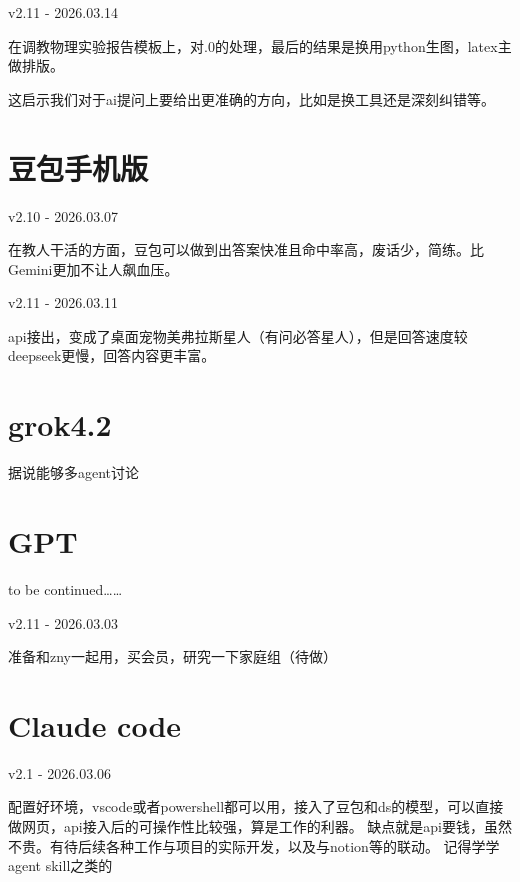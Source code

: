 \documentclass[11pt, a4paper, oneside]{book}
\begin{document}
\begin{updatelog}{v2.11 - 2026.03.14}
     
   在调教物理实验报告模板上，对.0的处理，最后的结果是换用python生图，latex主做排版。

   这启示我们对于ai提问上要给出更准确的方向，比如是换工具还是深刻纠错等。

\end{updatelog}

\section{豆包手机版}
\begin{inspiration}{v2.10 - 2026.03.07}
     
  在教人干活的方面，豆包可以做到出答案快准且命中率高，废话少，简练。比Gemini更加不让人飙血压。

\end{inspiration}

\begin{updatelog}{v2.11 - 2026.03.11}
     
    api接出，变成了桌面宠物美弗拉斯星人（有问必答星人），但是回答速度较deepseek更慢，回答内容更丰富。

\end{updatelog}

\section{grok4.2}
据说能够多agent讨论

\section{GPT}
to be continued……

\begin{updatelog}{v2.11 - 2026.03.03}
    
    准备和zny一起用，买会员，研究一下家庭组（待做）

\end{updatelog}

\section{Claude code}
\begin{updatelog}{v2.1 - 2026.03.06}
    
    配置好环境，vscode或者powershell都可以用，接入了豆包和ds的模型，可以直接做网页，api接入后的可操作性比较强，算是工作的利器。
    缺点就是api要钱，虽然不贵。有待后续各种工作与项目的实际开发，以及与notion等的联动。
    记得学学agent skill之类的

\end{updatelog}
\end{document}

